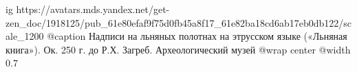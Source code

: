  
 
 
 
 

\ifcmt
  ig https://avatars.mds.yandex.net/get-zen_doc/1918125/pub_61e80efaf9f75d0fb45a8f17_61e82ba18cd6ab17eb0db122/scale_1200
	@caption Надписи на льняных полотнах на этрусском языке («Льняная книга»). Ок. 250 г. до Р.Х. Загреб. Археологический музей
	@wrap center
	@width 0.7
\fi
